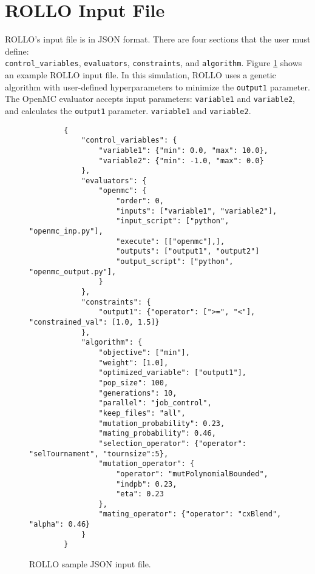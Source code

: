 \section{ROLLO Input File}
\gls{ROLLO}'s input file is in JSON format. 
There are four sections that the user must define: \\ \texttt{control\_variables}, 
\texttt{evaluators}, \texttt{constraints}, and \texttt{algorithm}. 
Figure \ref{fig:rollo-input} shows an example \gls{ROLLO} input file. 
In this simulation, \gls{ROLLO} uses a genetic algorithm with user-defined 
hyperparameters to minimize the \texttt{output1} parameter.
The OpenMC evaluator accepts input parameters: \texttt{variable1} and 
\texttt{variable2}, and calculates the \texttt{output1} parameter.
\texttt{variable1} and \texttt{variable2}. 
\begin{figure}[htbp]
    \begin{verbatim}
        {
            "control_variables": {
                "variable1": {"min": 0.0, "max": 10.0}, 
                "variable2": {"min": -1.0, "max": 0.0}
            }, 
            "evaluators": {
                "openmc": {
                    "order": 0,
                    "inputs": ["variable1", "variable2"],
                    "input_script": ["python", "openmc_inp.py"],
                    "execute": [["openmc"],],
                    "outputs": ["output1", "output2"]
                    "output_script": ["python", "openmc_output.py"], 
                }
            }, 
            "constraints": {
                "output1": {"operator": [">=", "<"], "constrained_val": [1.0, 1.5]}
            }, 
            "algorithm": {
                "objective": ["min"], 
                "weight": [1.0],
                "optimized_variable": ["output1"], 
                "pop_size": 100, 
                "generations": 10, 
                "parallel": "job_control",
                "keep_files": "all",
                "mutation_probability": 0.23,
                "mating_probability": 0.46,
                "selection_operator": {"operator": "selTournament", "tournsize":5},
                "mutation_operator": {
                    "operator": "mutPolynomialBounded",
                    "indpb": 0.23,
                    "eta": 0.23
                },
                "mating_operator": {"operator": "cxBlend", "alpha": 0.46}
            }
        }
    \end{verbatim}
    \caption{\acrfull{ROLLO} sample JSON input file.}
    \label{fig:rollo-input}
\end{figure}

